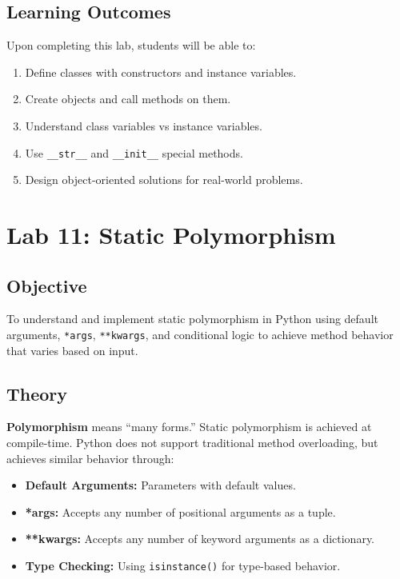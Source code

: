 \documentclass[12pt,a4paper]{article}
\begin{document}
\subsection{Learning Outcomes}
Upon completing this lab, students will be able to:
\begin{enumerate}
  \item Define classes with constructors and instance variables.
  \item Create objects and call methods on them.
  \item Understand class variables vs instance variables.
  \item Use \texttt{\_\_str\_\_} and \texttt{\_\_init\_\_} special methods.
  \item Design object-oriented solutions for real-world problems.
\end{enumerate}

\newpage

\section{Lab 11: Static Polymorphism}

\subsection{Objective}
To understand and implement static polymorphism in Python using default arguments, \texttt{*args}, \texttt{**kwargs}, and conditional logic to achieve method behavior that varies based on input.

\subsection{Theory}

\textbf{Polymorphism} means ``many forms.'' Static polymorphism is achieved at compile-time. Python does not support traditional method overloading, but achieves similar behavior through:
\begin{itemize}
  \item \textbf{Default Arguments:} Parameters with default values.
  \item \textbf{*args:} Accepts any number of positional arguments as a tuple.
  \item \textbf{**kwargs:} Accepts any number of keyword arguments as a dictionary.
  \item \textbf{Type Checking:} Using \texttt{isinstance()} for type-based behavior.
\end{itemize}
\end{document}
